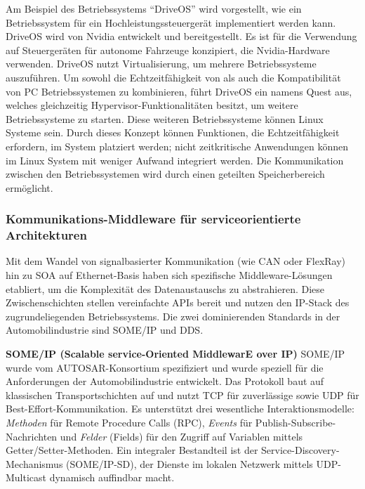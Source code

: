 Am Beispiel des Betriebssystems \enquote{DriveOS} wird vorgestellt, wie ein Betriebssystem für ein Hochleistungssteuergerät implementiert werden kann. DriveOS wird von Nvidia entwickelt und bereitgestellt. Es ist für die Verwendung auf Steuergeräten für autonome Fahrzeuge konzipiert, die Nvidia-Hardware verwenden. \cite{Nvidia2024} DriveOS nutzt Virtualisierung, um mehrere Betriebssysteme auszuführen. Um sowohl die Echtzeitfähigkeit von  als auch die Kompatibilität von PC Betriebssystemen zu kombinieren, führt DriveOS ein  namens Quest aus, welches gleichzeitig Hypervisor-Funktionalitäten besitzt, um weitere Betriebssysteme zu starten. Diese weiteren Betriebssysteme können Linux Systeme sein. Durch dieses Konzept können Funktionen, die Echtzeitfähigkeit erfordern, im  System platziert werden; nicht zeitkritische Anwendungen können im Linux System mit weniger Aufwand integriert werden. Die Kommunikation zwischen den Betriebssystemen wird durch einen geteilten Speicherbereich ermöglicht. \cite{Sinha2021}

\subsubsection{Kommunikations-Middleware für serviceorientierte Architekturen}
\label{sec:middleware_someip_dds}

Mit dem Wandel von signalbasierter Kommunikation (wie CAN oder FlexRay) hin zu \gls{SOA} auf Ethernet-Basis haben sich spezifische Middleware-Lösungen etabliert, um die Komplexität des Datenaustauschs zu abstrahieren. Diese Zwischenschichten stellen vereinfachte APIs bereit und nutzen den IP-Stack des zugrundeliegenden Betriebssystems. \cite{Kluener2025} Die zwei dominierenden Standards in der Automobilindustrie sind SOME/IP und DDS.

\textbf{SOME/IP (Scalable service-Oriented MiddlewarE over IP)}
SOME/IP wurde vom AUTOSAR-Konsortium spezifiziert und wurde speziell für die Anforderungen der Automobilindustrie entwickelt. \cite{Autosar2023SomeIP} Das Protokoll baut auf klassischen Transportschichten auf und nutzt TCP für zuverlässige sowie UDP für Best-Effort-Kommunikation. \cite{Kluener2025}
Es unterstützt drei wesentliche Interaktionsmodelle: \textit{Methoden} für Remote Procedure Calls (RPC), \textit{Events} für Publish-Subscribe-Nachrichten und \textit{Felder} (Fields) für den Zugriff auf Variablen mittels Getter/Setter-Methoden. \cite{Kluener2025}
Ein integraler Bestandteil ist der Service-Discovery-Mechanismus (SOME/IP-SD), der Dienste im lokalen Netzwerk mittels UDP-Multicast dynamisch auffindbar macht. \cite{Kluener2025}

